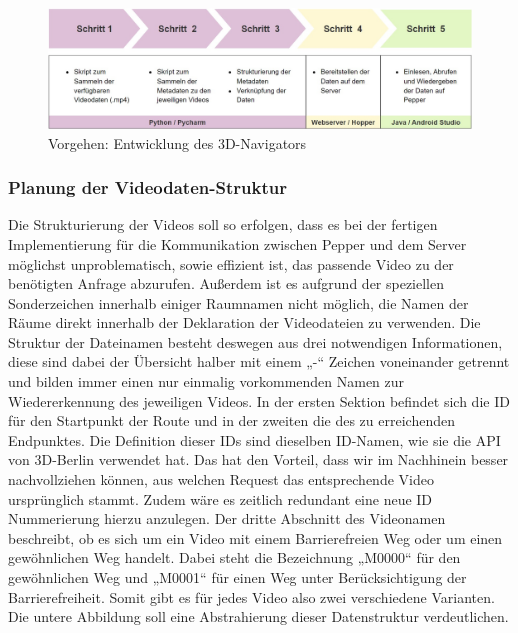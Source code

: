 \begin{figure}[H]
    \includegraphics[width=\textwidth]{Figures/3DNavigator/Implementierungdes3DNavigators.jpg}
    \caption{Vorgehen: Entwicklung des 3D-Navigators}
    \label{fig:integration}
    \centering
\end{figure}

\subsubsection{Planung der Videodaten-Struktur}

Die Strukturierung der Videos soll so erfolgen, dass es bei der fertigen Implementierung für die Kommunikation zwischen Pepper und dem Server möglichst unproblematisch, sowie effizient ist, das passende Video zu der benötigten Anfrage abzurufen. Außerdem ist es aufgrund der speziellen Sonderzeichen innerhalb einiger Raumnamen nicht möglich, die Namen der Räume direkt innerhalb der Deklaration der Videodateien zu verwenden. Die Struktur der Dateinamen besteht deswegen aus drei notwendigen Informationen, diese sind dabei der Übersicht halber mit einem „-“ Zeichen voneinander getrennt und bilden immer einen nur einmalig vorkommenden Namen zur Wiedererkennung des jeweiligen Videos. In der ersten Sektion befindet sich die ID für den Startpunkt der Route und in der zweiten die des zu erreichenden Endpunktes. Die Definition dieser IDs sind dieselben ID-Namen, wie sie die API von 3D-Berlin verwendet hat. Das hat den Vorteil, dass wir im Nachhinein besser nachvollziehen können, aus welchen Request das entsprechende Video ursprünglich stammt. Zudem wäre es zeitlich redundant eine neue ID Nummerierung hierzu anzulegen. Der dritte Abschnitt des Videonamen beschreibt, ob es sich um ein Video mit einem Barrierefreien Weg oder um einen gewöhnlichen Weg handelt. Dabei steht die Bezeichnung „M0000“ für den gewöhnlichen Weg und „M0001“ für einen Weg unter Berücksichtigung der Barrierefreiheit. Somit gibt es für jedes Video also zwei verschiedene Varianten. Die untere Abbildung soll eine Abstrahierung dieser Datenstruktur verdeutlichen.\vspace{-2.5mm}

